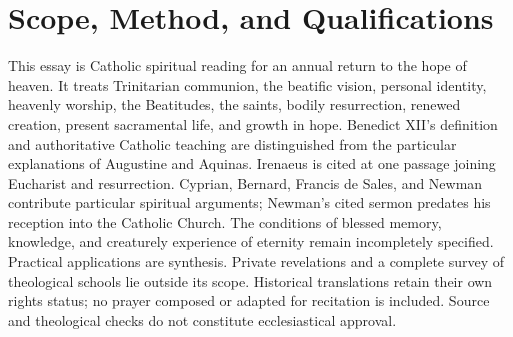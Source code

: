 \section{Scope, Method, and Qualifications}
This essay is Catholic spiritual reading for an annual return to the hope of heaven. It treats Trinitarian communion, the beatific vision, personal identity, heavenly worship, the Beatitudes, the saints, bodily resurrection, renewed creation, present sacramental life, and growth in hope. Benedict XII's definition and authoritative Catholic teaching are distinguished from the particular explanations of Augustine and Aquinas. Irenaeus is cited at one passage joining Eucharist and resurrection. Cyprian, Bernard, Francis de Sales, and Newman contribute particular spiritual arguments; Newman's cited sermon predates his reception into the Catholic Church. The conditions of blessed memory, knowledge, and creaturely experience of eternity remain incompletely specified. Practical applications are synthesis. Private revelations and a complete survey of theological schools lie outside its scope. Historical translations retain their own rights status; no prayer composed or adapted for recitation is included. Source and theological checks do not constitute ecclesiastical approval.

